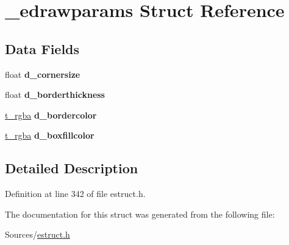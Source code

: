 \hypertarget{struct__edrawparams}{\section{\-\_\-edrawparams Struct Reference}
\label{struct__edrawparams}
}
\subsection*{Data Fields}
\begin{DoxyCompactItemize}
\item 
\hypertarget{struct__edrawparams_aabe78053b56e3bf3df55c7b85fa251b2}{float {\bfseries d\-\_\-cornersize}}\label{struct__edrawparams_aabe78053b56e3bf3df55c7b85fa251b2}

\item 
\hypertarget{struct__edrawparams_a9c360cb962f79a835ed0457d1dad34b5}{float {\bfseries d\-\_\-borderthickness}}\label{struct__edrawparams_a9c360cb962f79a835ed0457d1dad34b5}

\item 
\hypertarget{struct__edrawparams_af4ac3d463e5738bdbf0c2bbf15be9ae3}{\hyperlink{struct__rgba}{t\-\_\-rgba} {\bfseries d\-\_\-bordercolor}}\label{struct__edrawparams_af4ac3d463e5738bdbf0c2bbf15be9ae3}

\item 
\hypertarget{struct__edrawparams_aaf0259436a4f71d6659c0447e4b98e2b}{\hyperlink{struct__rgba}{t\-\_\-rgba} {\bfseries d\-\_\-boxfillcolor}}\label{struct__edrawparams_aaf0259436a4f71d6659c0447e4b98e2b}

\end{DoxyCompactItemize}


\subsection{Detailed Description}


Definition at line 342 of file estruct.\-h.



The documentation for this struct was generated from the following file\-:\begin{DoxyCompactItemize}
\item 
Sources/\hyperlink{estruct_8h}{estruct.\-h}\end{DoxyCompactItemize}
